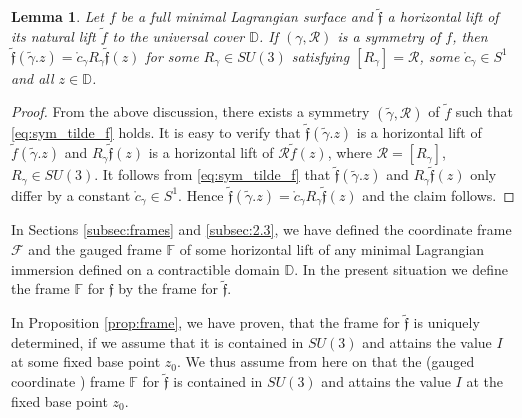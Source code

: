 \documentclass[a4paper,11pt]{amsart}
\newtheorem{lemma}[theorem]{Lemma}
\theoremstyle{definition}
\numberwithin{equation}{section}
\newcommand{\D}{\mathbb{D}}
\newcommand{\F}{\mathbb{F}}
\newcommand{\f}{\mathfrak{f}}
\begin{document}
\begin{lemma}
Let $f$ be a full  minimal Lagrangian surface  and  $\tilde{\f}$  a
 horizontal lift of its natural lift $\tilde{f}$ to the universal cover $\D$.
If $(\gamma, \mathcal{R})$  is a symmetry of $f$, then
$\tilde{\f} (\tilde{\gamma}.z) = \mathring{c}_{\gamma} R_{\gamma} \tilde{\f}(z)$ for some $R_{\gamma} \in SU(3)$ satisfying $[R_{\gamma}] = \mathcal{R}$, some  $\mathring{c}_{\gamma} \in S^1$ and all $z\in \D$.
\end{lemma}

\begin{proof} From the above discussion, there exists a symmetry $(\tilde{\gamma}, \mathcal{R})$ of $\tilde{f}$ such that \eqref{eq:sym_tilde_f} holds. 
 It is easy to verify that $\tilde{\f}(\tilde{\gamma}.z)$ is a horizontal lift of $\tilde{f}(\tilde{\gamma}.z)$ and 
$R_{\gamma}\tilde{\f}(z)$ is a horizontal lift of $\mathcal{R}\tilde{f}(z)$, where $\mathcal{R} = [R_{\gamma}]$, $R_{\gamma} \in SU(3)$. 
It follows from \eqref{eq:sym_tilde_f} that $\tilde{\f}(\tilde{\gamma}.z)$ and $R_{\gamma} \tilde{\f}(z)$ 
only differ by a constant  $\mathring{c}_{\gamma} \in S^1$. 
Hence $\tilde{\f}(\tilde{\gamma}.z) = \mathring{c}_{\gamma} R_{\gamma}\tilde{\f}(z)$ and the  claim follows.
\end{proof}

In Sections \ref{subsec:frames} and \ref{subsec:2.3},
we have defined the coordinate frame $\mathcal{F}$  and
the gauged frame $\F$ of some horizontal lift of any minimal Lagrangian immersion defined on a contractible domain $\D$.
In the present situation we define the frame
$\F$ for $\f$ by  
the frame for $\tilde{\f}$.

In Proposition \ref{prop:frame},
we have proven, that the frame for $\tilde{\f}$
is uniquely determined, if we assume that it is contained in $SU(3)$ and attains the value $I$ at some fixed base point $z_0$.
%
 We thus assume from here on that  the (gauged coordinate ) frame $\F$ for $\tilde{\f}$ is 
 contained in $SU(3)$ and attains the value $I$ at the fixed base point $z_0$.
 
\end{document}
